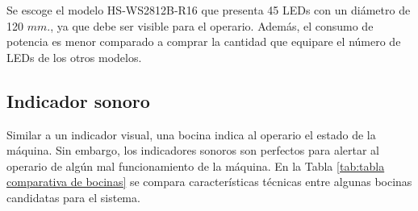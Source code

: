 Se escoge el modelo HS-WS2812B-R16 que presenta 45 LEDs con un diámetro de 120 $mm.$, ya que debe ser visible para el operario. Además, el consumo de potencia es menor comparado a comprar la cantidad que equipare el número de LEDs de los otros modelos.

\subsection{Indicador sonoro}

Similar a un indicador visual, una bocina indica al operario el estado de la máquina. Sin embargo, los indicadores sonoros son perfectos para alertar al operario de algún mal funcionamiento de la máquina. En la Tabla \ref{tab:tabla comparativa de bocinas} se compara características técnicas entre algunas bocinas candidatas para el sistema.

